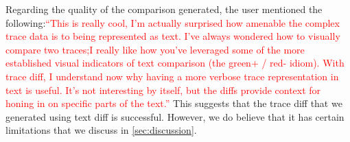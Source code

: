  Regarding the quality of the comparison generated, the user mentioned the following:\textcolor{red}{``This is really cool, I'm actually 
surprised how amenable the complex trace data is to being represented as text.  I've always wondered how to visually compare two traces;I 
really like how you've leveraged some of the more established visual indicators of text comparison (the green+ / red- idiom). With trace diff,
I understand now why having a more verbose trace representation in text is useful.  It's not interesting by itself, but the diffs provide 
context for honing in on specific parts of the text.''} This suggests that the trace diff that we generated using text diff is successful.
However, we do believe that it has certain limitations that we discuss in \autoref{sec:discussion}.
